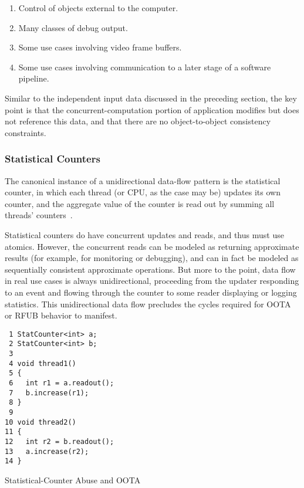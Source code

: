 \documentclass[10]{article}
\begin{document}
\begin{enumerate}
\item	Control of objects external to the computer.
\item	Many classes of debug output.
\item	Some use cases involving video frame buffers.
\item	Some use cases involving communication to a later stage of a
	software pipeline.
\end{enumerate}

Similar to the independent input data discussed in the preceding section,
the key point is that the concurrent-computation portion of application
modifies but does not reference this data, and that there are no
object-to-object consistency constraints.

\subsubsection{Statistical Counters}
\label{sec:Statistical Counters}

The canonical instance of a unidirectional data-flow pattern is the
statistical counter, in which each thread (or CPU, as the case may be)
updates its own counter, and the aggregate value of the counter is read
out by summing all threads'
counters~\cite[Section 5.2]{McKenney2018ParallelProgramming-2018-12-08a}.

Statistical counters do have concurrent updates and reads, and thus must
use atomics.
However, the concurrent reads can be modeled as returning approximate
results (for example, for monitoring or debugging), and can in fact be
modeled as sequentially consistent approximate operations.
But more to the point, data flow in real use cases is always
unidirectional, proceeding from the updater responding to an event
and flowing through the counter to some reader displaying or logging
statistics.
This unidirectional data flow precludes the cycles required for OOTA or
RFUB behavior to manifest.

\begin{listing}[tbp]
\begin{verbatim}
 1 StatCounter<int> a;
 2 StatCounter<int> b;
 3
 4 void thread1()
 5 {
 6   int r1 = a.readout();
 7   b.increase(r1);
 8 }
 9
10 void thread2()
11 {
12   int r2 = b.readout();
13   a.increase(r2);
14 }
\end{verbatim}
\caption{Statistical-Counter Abuse and OOTA}
\label{lst:Statistical-Counter Abuse and OOTA}
\end{listing}
\end{document}
